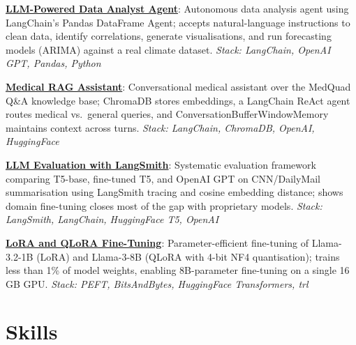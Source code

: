 \documentclass[10pt,a4paper]{article}
\begin{document}
\textbf{\href{https://github.com/adebanjiadelowo/llm-portfolio/tree/main/04-data-analyst-agent}{LLM-Powered Data Analyst Agent}}: Autonomous data analysis agent using LangChain's Pandas DataFrame Agent; accepts natural-language instructions to clean data, identify correlations, generate visualisations, and run forecasting models (ARIMA) against a real climate dataset.
\textit{Stack: LangChain, OpenAI GPT, Pandas, Python}

\textbf{\href{https://github.com/adebanjiadelowo/llm-portfolio/tree/main/05-medical-rag-assistant}{Medical RAG Assistant}}: Conversational medical assistant over the MedQuad Q\&A knowledge base; ChromaDB stores embeddings, a LangChain ReAct agent routes medical vs.\ general queries, and ConversationBufferWindowMemory maintains context across turns.
\textit{Stack: LangChain, ChromaDB, OpenAI, HuggingFace}

\textbf{\href{https://github.com/adebanjiadelowo/llm-portfolio/tree/main/06-llm-evaluation-langsmith}{LLM Evaluation with LangSmith}}: Systematic evaluation framework comparing T5-base, fine-tuned T5, and OpenAI GPT on CNN/DailyMail summarisation using LangSmith tracing and cosine embedding distance; shows domain fine-tuning closes most of the gap with proprietary models.
\textit{Stack: LangSmith, LangChain, HuggingFace T5, OpenAI}

\textbf{\href{https://github.com/adebanjiadelowo/llm-portfolio/tree/main/07-lora-qlora-finetuning}{LoRA and QLoRA Fine-Tuning}}: Parameter-efficient fine-tuning of Llama-3.2-1B (LoRA) and Llama-3-8B (QLoRA with 4-bit NF4 quantisation); trains less than 1\% of model weights, enabling 8B-parameter fine-tuning on a single 16\,GB GPU.
\textit{Stack: PEFT, BitsAndBytes, HuggingFace Transformers, trl}

\section{Skills}
\end{document}
